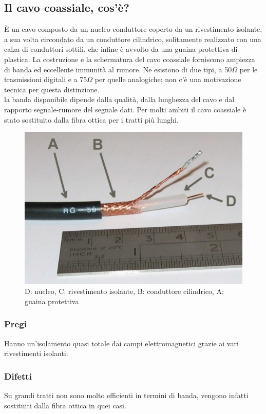\subsection{Il cavo coassiale, cos'è?} 
È un cavo composto da un nucleo conduttore coperto da un rivestimento isolante, a sua volta circondato da un conduttore cilindrico, solitamente realizzato con una calza di conduttori sottili, che infine è avvolto da una guaina protettiva di plastica. La costruzione e la schermatura del cavo coassiale forniscono ampiezza di banda ed eccellente immunità al rumore. Ne esistono di due tipi, a 50$\Omega$ per le trasmissioni digitali e a 75$\Omega$ per quelle analogiche; non c’è una motivazione tecnica per questa distinzione. \\
la banda disponibile dipende dalla qualità, dalla lunghezza del cavo e dal rapporto segnale-rumore del segnale dati. Per molti ambiti il cavo coassiale è stato sostituito dalla fibra ottica per i tratti più lunghi.

\begin{figure}[H]
\centering
\includegraphics[scale=1]{res/img/3_cavoCoassiale.jpg}
\caption{D: nucleo, C: rivestimento isolante, B: conduttore cilindrico, A: guaina protettiva}
\end{figure}

\subsubsection{Pregi}
Hanno un'isolamento quasi totale dai campi elettromagnetici grazie ai vari rivestimenti isolanti. 

\subsubsection{Difetti}
Su grandi tratti non sono molto efficienti in termini di banda, vengono infatti sostituiti dalla fibra ottica in quei casi.

